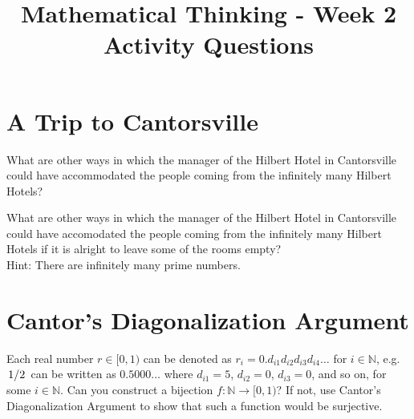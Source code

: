 \documentclass[12pt]{exam}
\title{Mathematical Thinking - Week 2 \\ 
Activity Questions}
\begin{document}
\maketitle
\tableofcontents
\section{A Trip to Cantorsville}
\begin{questions}
    \question What are other ways in which the manager of the Hilbert Hotel in Cantorsville could have accommodated the people coming from the infinitely many Hilbert Hotels?

    \question What are other ways in which the manager of the Hilbert Hotel in Cantorsville could have accomodated the people coming from the infinitely many Hilbert Hotels if it is alright to leave some of the rooms empty?\\
    Hint: There are infinitely many prime numbers.
\end{questions}
\section{Cantor's Diagonalization Argument}
\begin{questions}
\question Each real number $r \in [0,1)$ can be denoted as $r_i = 0.d_{i1}d_{i2}d_{i3}d_{i4}\ldots$ for $i \in \mathbb{N}$, e.g. $\flatfrac{1}{2}$ can be written as $0.5000\ldots$ where $d_{i1} = 5$, $d_{i2} = 0$, $d_{i3} = 0$, and so on, for some $i \in \mathbb{N}$. Can you construct a bijection $f : \mathbb{N} \to [0,1)$? If not, use Cantor's Diagonalization Argument to show that such a function would be surjective.
\end{questions}
\end{document}
